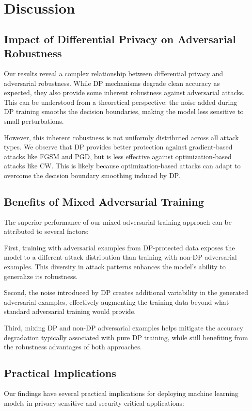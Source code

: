 \documentclass[11pt, conference]{IEEEtran}
\begin{document}
\section{Discussion}

\subsection{Impact of Differential Privacy on Adversarial Robustness}
Our results reveal a complex relationship between differential privacy and adversarial robustness. While DP mechanisms degrade clean accuracy as expected, they also provide some inherent robustness against adversarial attacks. This can be understood from a theoretical perspective: the noise added during DP training smooths the decision boundaries, making the model less sensitive to small perturbations.

However, this inherent robustness is not uniformly distributed across all attack types. We observe that DP provides better protection against gradient-based attacks like FGSM and PGD, but is less effective against optimization-based attacks like CW. This is likely because optimization-based attacks can adapt to overcome the decision boundary smoothing induced by DP.

\subsection{Benefits of Mixed Adversarial Training}
The superior performance of our mixed adversarial training approach can be attributed to several factors:

First, training with adversarial examples from DP-protected data exposes the model to a different attack distribution than training with non-DP adversarial examples. This diversity in attack patterns enhances the model's ability to generalize its robustness.

Second, the noise introduced by DP creates additional variability in the generated adversarial examples, effectively augmenting the training data beyond what standard adversarial training would provide.

Third, mixing DP and non-DP adversarial examples helps mitigate the accuracy degradation typically associated with pure DP training, while still benefiting from the robustness advantages of both approaches.

\subsection{Practical Implications}
Our findings have several practical implications for deploying machine learning models in privacy-sensitive and security-critical applications:
\end{document}
